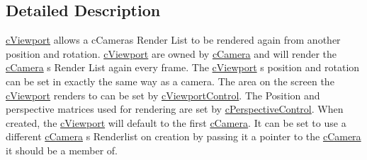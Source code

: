 \subsection{Detailed Description}
\hyperlink{classc_viewport}{cViewport} allows a cCameras Render List to be rendered again from another position and rotation. \hyperlink{classc_viewport}{cViewport} are owned by \hyperlink{classc_camera}{cCamera} and will render the \hyperlink{classc_camera}{cCamera} s Render List again every frame. The \hyperlink{classc_viewport}{cViewport} s position and rotation can be set in exactly the same way as a camera. The area on the screen the \hyperlink{classc_viewport}{cViewport} renders to can be set by \hyperlink{classc_viewport_control}{cViewportControl}. The Position and perspective matrices used for rendering are set by \hyperlink{classc_perspective_control}{cPerspectiveControl}. When created, the \hyperlink{classc_viewport}{cViewport} will default to the first \hyperlink{classc_camera}{cCamera}. It can be set to use a different \hyperlink{classc_camera}{cCamera} s Renderlist on creation by passing it a pointer to the \hyperlink{classc_camera}{cCamera} it should be a member of. 